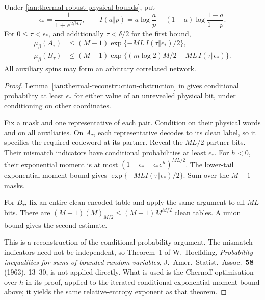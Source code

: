 \begin{lemma}
\label{ian:thermal-bit-tube-obstruction}
Under \eqref{ian:thermal-robust-physical-bounds}, put
\[
 \epsilon_*=\frac1{1+e^{2\beta dJ}},\qquad
 I(a\Vert p)=a\log\frac ap+(1-a)\log\frac{1-a}{1-p}.
 \tag{38.10}
\]
For \(0\le\tau<\epsilon_*\), and additionally
\(\tau<\delta/2\) for the first bound,
\[
 \begin{aligned}
 \mu_\beta(A_\tau)
   &\le(M-1)\exp\{-ML\,I(\tau\Vert\epsilon_*)/2\},\\
 \mu_\beta(B_\tau)
   &\le(M-1)\exp\{(m\log2)M/2
                         -ML\,I(\tau\Vert\epsilon_*)\}.
 \end{aligned}
 \tag{38.11}\label{ian:thermal-bit-tube-bounds}
\]
All auxiliary spins may form an arbitrary correlated network.
\end{lemma}

\begin{proof}
Lemma~\ref{ian:thermal-reconstruction-obstruction} in
 gives conditional probability
at least \(\epsilon_*\) for either value of an unrevealed physical
bit, under conditioning on other coordinates.

Fix a mask and one representative of each pair. Condition on their
physical words and on all auxiliaries. On \(A_\tau\), each
representative decodes to its clean label, so it specifies the
required codeword at its partner. Reveal the \(ML/2\) partner bits.
Their mismatch indicators have conditional probabilities at least
\(\epsilon_*\). For \(h<0\), their exponential moment is at most
\((1-\epsilon_*+\epsilon_*e^h)^{ML/2}\).
The lower-tail exponential-moment bound gives
\(\exp\{-MLI(\tau\Vert\epsilon_*)/2\}\).
Sum over the \(M-1\) masks.

For \(B_\tau\), fix an entire clean encoded table and apply the same
argument to all \(ML\) bits. There are
\((M-1)(M)_{M/2}\le(M-1)M^{M/2}\) clean tables. A union bound gives
the second estimate.

This is a reconstruction of the conditional-probability argument.
The mismatch indicators need not be independent, so Theorem~1 of
W.~Hoeffding, \emph{Probability inequalities for sums of bounded
random variables}, J.~Amer.\ Statist.\ Assoc.\
\textbf{58} (1963), 13--30, is not applied directly. What is used is
the Chernoff optimisation over \(h\) in its proof, applied to the
iterated conditional exponential-moment bound above; it yields the
same relative-entropy exponent as that theorem.
\end{proof}

